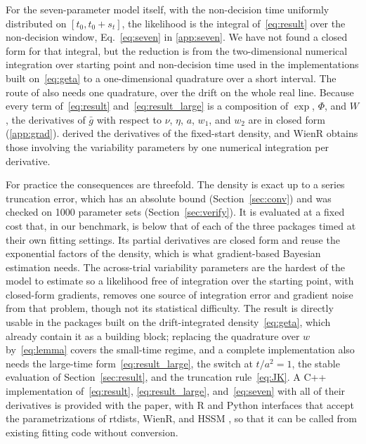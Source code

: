 \documentclass[final,5p,times,twocolumn,authoryear]{elsarticle}
\newcommand{\gbar}{\bar{g}}
\begin{document}
For the seven-parameter model itself, with the non-decision time uniformly distributed on $[t_0, t_0 + s_t]$, the likelihood is the integral of~\eqref{eq:result} over the non-decision window, Eq.~\eqref{eq:seven} in \ref{app:seven}. We have not found a closed form for that integral, but the reduction is from the two-dimensional numerical integration over starting point and non-decision time used in the implementations built on~\eqref{eq:geta} to a one-dimensional quadrature over a short interval. The route of \citet{Tuerlinckx2004} also needs one quadrature, over the drift on the whole real line. Because every term of~\eqref{eq:result} and~\eqref{eq:result_large} is a composition of $\exp$, $\Phi$, and $W$, the derivatives of $\gbar$ with respect to $\nu$, $\eta$, $a$, $w_1$, and $w_2$ are in closed form (\ref{app:grad}). \citet{HartmannKlauer2021} derived the derivatives of the fixed-start density, and WienR obtains those involving the variability parameters by one numerical integration per derivative.

For practice the consequences are threefold. The density is exact up to a series truncation error, which has an absolute bound (Section~\ref{sec:conv}) and was checked on 1000 parameter sets (Section~\ref{sec:verify}). It is evaluated at a fixed cost that, in our benchmark, is below that of each of the three packages timed at their own fitting settings. Its partial derivatives are closed form and reuse the exponential factors of the density, which is what gradient-based Bayesian estimation \citep{Wiecki2013, Henrich2024} needs. The across-trial variability parameters are the hardest of the model to estimate \citep{Boehm2018} so a likelihood free of integration over the starting point, with closed-form gradients, removes one source of integration error and gradient noise from that problem, though not its statistical difficulty. The result is directly usable in the packages built on the drift-integrated density~\eqref{eq:geta}, which already contain it as a building block; replacing the quadrature over $w$ by~\eqref{eq:lemma} covers the small-time regime, and a complete implementation also needs the large-time form~\eqref{eq:result_large}, the switch at $t/a^2 = 1$, the stable evaluation of Section~\ref{sec:result}, and the truncation rule~\eqref{eq:JK}. A C++ implementation of~\eqref{eq:result}, \eqref{eq:result_large}, and~\eqref{eq:seven} with all of their derivatives is provided with the paper, with R and Python interfaces that accept the parametrizations of rtdists, WienR, and HSSM \citep{fengler2026hssm}, so that it can be called from existing fitting code without conversion.
\end{document}
